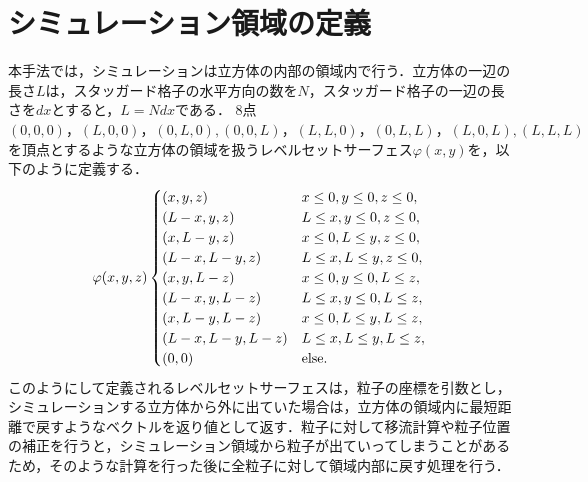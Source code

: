 \documentclass[a4j,12pt]{jreport}
\begin{document}
\section{シミュレーション領域の定義} \label{sec:levelsetserface}
本手法では，シミュレーションは立方体の内部の領域内で行う．立方体の一辺の長さ$L$は，スタッガード格子の水平方向の数を$N$，スタッガード格子の一辺の長さを$dx$とすると，$L = Ndx$である．
8点$ (0,0,0) ， (L,0,0) ， (0,L,0) , (0,0,L) ， (L,L,0) ， (0,L,L) ， (L,0,L) , (L,L,L) $を頂点とするような立方体の領域を扱うレベルセットサーフェス$\varphi (x,y) $を，以下のように定義する．
\begin{equation}\label{eq:levelsetserface}
\varphi (x,y,z) 
\begin{cases}
 (x,y,z)  & x \le0 , y \le 0,z \le 0,\\
 (L - x,y,z)  & L \le x , y \le 0,z \le 0,\\
 (x,L-y,z)  & x \le0 , L \le y,z \le 0,\\
 (L-x,L-y,z)  & L \le x , L \le y,z \le 0,\\
 (x,y,L-z)  & x \le0 , y \le 0,L \le z,\\
 (L - x,y,L-z)  & L \le x , y \le 0,L \le z,\\
 (x,L-y,L-z)  & x \le0 , L \le y,L \le z,\\
 (L-x,L-y,L-z)  & L \le x , L \le y,L \le z,\\
 (0,0)  & \rm{else}.\\
\end{cases}
\end{equation} 
このようにして定義されるレベルセットサーフェスは，粒子の座標を引数とし，シミュレーションする立方体から外に出ていた場合は，立方体の領域内に最短距離で戻すようなベクトルを返り値として返す．粒子に対して移流計算や粒子位置の補正を行うと，シミュレーション領域から粒子が出ていってしまうことがあるため，そのような計算を行った後に全粒子に対して領域内部に戻す処理を行う．
\end{document}
